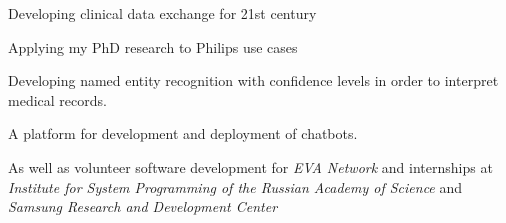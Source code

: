 \documentclass[10pt,a4paper,ragged2e,academicons]{altacv}
\begin{document}

\begin{fullwidth}
\makecvheader
\end{fullwidth}




Developing clinical data exchange for 21st century

\smallskip


Applying my PhD research to Philips use cases

\smallskip


Developing named entity recognition with confidence levels in order to interpret medical records.

\smallskip


A platform for development and deployment of chatbots.

\smallskip

As well as volunteer software development for \emph{EVA Network} and internships at \emph{Institute for System Programming of the Russian Academy of Science} and \emph{Samsung Research and Development Center}
\end{document}
